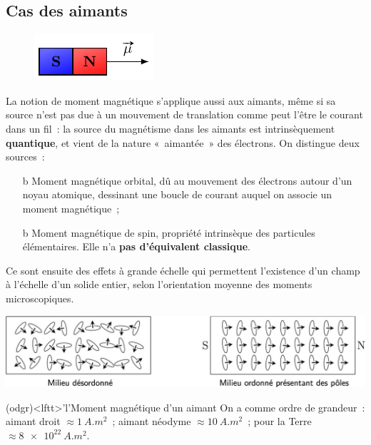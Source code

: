 \documentclass[../../main/main.tex]{subfiles}
\begin{document}
\subsection{Cas des aimants}
\label{ssec:magaim}
	\begin{figure}
		\vspace*{-35pt}
		\begin{center}
  \includegraphics[scale=1]{momag_aimdroit}
		\end{center}
	\end{figure}
  La notion de moment magnétique s'applique aussi aux aimants, même si sa source
n'est pas due à un mouvement de translation comme peut l'être le courant dans un
fil~: la source du magnétisme dans les aimants est intrinsèquement
\textbf{quantique}, et vient de la nature «~aimantée~» des électrons. On
distingue deux sources~:
\begin{itemize}
  \item[b]{Moment magnétique orbital}, dû au mouvement des électrons autour d'un
    noyau atomique, dessinant une boucle de courant auquel on associe un moment
    magnétique~;
  \item[b]{Moment magnétique de spin}, propriété intrinsèque des particules
    élémentaires. Elle n'a \textbf{pas d'équivalent classique}.
\end{itemize}
Ce sont ensuite des effets à grande échelle qui permettent l'existence d'un
champ à l'échelle d'un solide entier, selon l'orientation moyenne des moments
microscopiques.

\begin{center}
  \includegraphics[scale=.8]{momag_aimdroit-qtq}
\end{center}

\begin{tcb*}(odgr)<lftt>'l'{Moment magnétique d'un aimant}
	On a comme ordre de grandeur~: aimant droit $\approx \SI{1}{A.m^2}$~; aimant
	néodyme $\approx \SI{10}{A.m^2}$~; pour la Terre $\approx \SI{8e22}{A.m^2}$.
\end{tcb*}
\vspace{-15pt}
\end{document}
